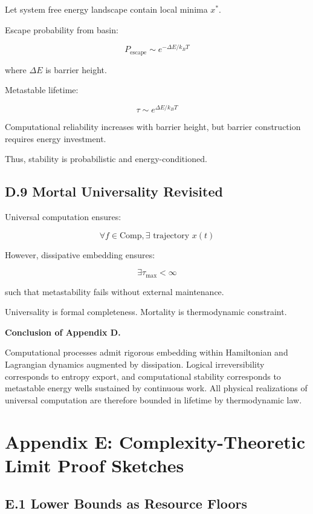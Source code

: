 \documentclass[11pt,openany]{book}
\begin{document}
Let system free energy landscape contain local minima $x^*$.

Escape probability from basin:

\[
P_{\text{escape}} \sim e^{-\Delta E / k_B T}
\]

where $\Delta E$ is barrier height.

Metastable lifetime:

\[
\tau \sim e^{\Delta E / k_B T}
\]

Computational reliability increases with barrier height, 
but barrier construction requires energy investment.

Thus, stability is probabilistic and energy-conditioned.

\subsection{D.9 Mortal Universality Revisited}

Universal computation ensures:

\[
\forall f \in \text{Comp}, \exists \text{ trajectory } x(t)
\]

However, dissipative embedding ensures:

\[
\exists \tau_{\text{max}} < \infty
\]

such that metastability fails without external maintenance.

Universality is formal completeness.
Mortality is thermodynamic constraint.

\bigskip

\textbf{Conclusion of Appendix D.}

Computational processes admit rigorous embedding 
within Hamiltonian and Lagrangian dynamics augmented 
by dissipation. Logical irreversibility corresponds 
to entropy export, and computational stability corresponds 
to metastable energy wells sustained by continuous work. 
All physical realizations of universal computation are therefore 
bounded in lifetime by thermodynamic law.

\section{Appendix E: Complexity-Theoretic Limit Proof Sketches}

\subsection{E.1 Lower Bounds as Resource Floors}
\end{document}
